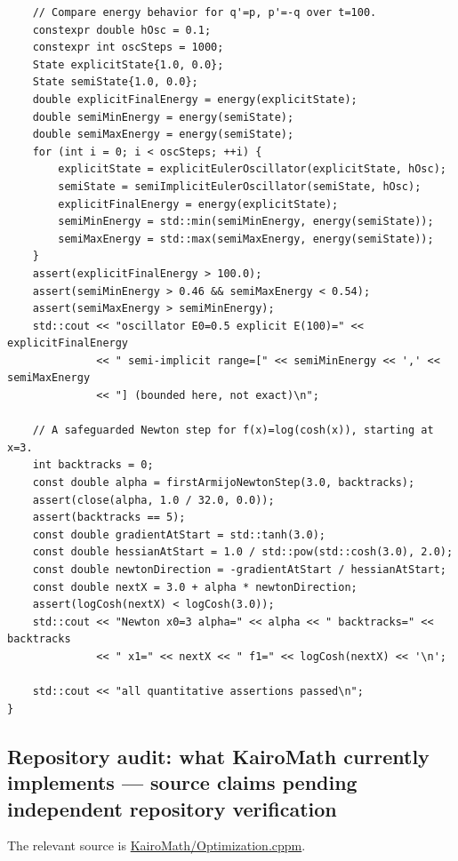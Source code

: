 \begin{verbatim}
    // Compare energy behavior for q'=p, p'=-q over t=100.
    constexpr double hOsc = 0.1;
    constexpr int oscSteps = 1000;
    State explicitState{1.0, 0.0};
    State semiState{1.0, 0.0};
    double explicitFinalEnergy = energy(explicitState);
    double semiMinEnergy = energy(semiState);
    double semiMaxEnergy = energy(semiState);
    for (int i = 0; i < oscSteps; ++i) {
        explicitState = explicitEulerOscillator(explicitState, hOsc);
        semiState = semiImplicitEulerOscillator(semiState, hOsc);
        explicitFinalEnergy = energy(explicitState);
        semiMinEnergy = std::min(semiMinEnergy, energy(semiState));
        semiMaxEnergy = std::max(semiMaxEnergy, energy(semiState));
    }
    assert(explicitFinalEnergy > 100.0);
    assert(semiMinEnergy > 0.46 && semiMaxEnergy < 0.54);
    assert(semiMaxEnergy > semiMinEnergy);
    std::cout << "oscillator E0=0.5 explicit E(100)=" << explicitFinalEnergy
              << " semi-implicit range=[" << semiMinEnergy << ',' << semiMaxEnergy
              << "] (bounded here, not exact)\n";

    // A safeguarded Newton step for f(x)=log(cosh(x)), starting at x=3.
    int backtracks = 0;
    const double alpha = firstArmijoNewtonStep(3.0, backtracks);
    assert(close(alpha, 1.0 / 32.0, 0.0));
    assert(backtracks == 5);
    const double gradientAtStart = std::tanh(3.0);
    const double hessianAtStart = 1.0 / std::pow(std::cosh(3.0), 2.0);
    const double newtonDirection = -gradientAtStart / hessianAtStart;
    const double nextX = 3.0 + alpha * newtonDirection;
    assert(logCosh(nextX) < logCosh(3.0));
    std::cout << "Newton x0=3 alpha=" << alpha << " backtracks=" << backtracks
              << " x1=" << nextX << " f1=" << logCosh(nextX) << '\n';

    std::cout << "all quantitative assertions passed\n";
}
\end{verbatim}

\subsection{Repository audit: what KairoMath currently implements --- source claims pending independent repository verification}\label{02-foundations-ii-ch028-repository-audit-what-kairomath-currently-implements-source-claims-pending-independent-repository-verification}

The relevant source is \href{https://github.com/swayam8624/KairoMath/blob/master/Optimization.cppm?utm_source=chatgpt.com}{KairoMath/Optimization.cppm}.

